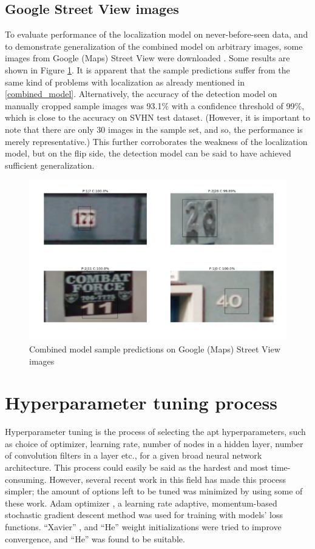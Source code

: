 \documentclass{article}
\begin{document}
	\subsection{Google Street View images}
	To evaluate performance of the localization model on never-before-seen data, and to demonstrate generalization of the combined model on arbitrary images, some images from Google (Maps) Street View were downloaded \cite{google-street-view-samples}. Some results are shown in Figure \ref{fig:sample_predict}. It is apparent that the sample predictions suffer from the same kind of problems with localization as already mentioned in \ref{combined_model}. Alternatively, the accuracy of the detection model on manually cropped sample images was 93.1\% with a confidence threshold of 99\%, which is close to the accuracy on SVHN test dataset. (However, it is important to note that there are only 30 images in the sample set, and so, the performance is merely representative.) This further corroborates the weakness of the localization model, but on the flip side, the detection model can be said to have achieved sufficient generalization.
	
	\begin{figure}[h]
		\centering
		\includegraphics[scale=0.6]{sample_predict}
		\caption{Combined model sample predictions on Google (Maps) Street View images}
		\label{fig:sample_predict}
	\end{figure}
	
	\section{Hyperparameter tuning process}
	Hyperparameter tuning is the process of selecting the apt hyperparameters, such as choice of optimizer, learning rate, number of nodes in a hidden layer, number of convolution filters in a layer etc., for a given broad neural network architecture. This process could easily be said as the hardest and most time-consuming. However, several recent work in this field has made this process simpler; the amount of options left to be tuned was minimized by using some of these work. Adam optimizer \cite{KingmaB14}, a learning rate adaptive, momentum-based stochastic gradient descent method was used for training with models' loss functions. ``Xavier'' \cite{Glorot10}, and ``He'' \cite{HeZR015} weight initializations were tried to improve convergence, and ``He'' was found to be suitable.
	
\end{document}
